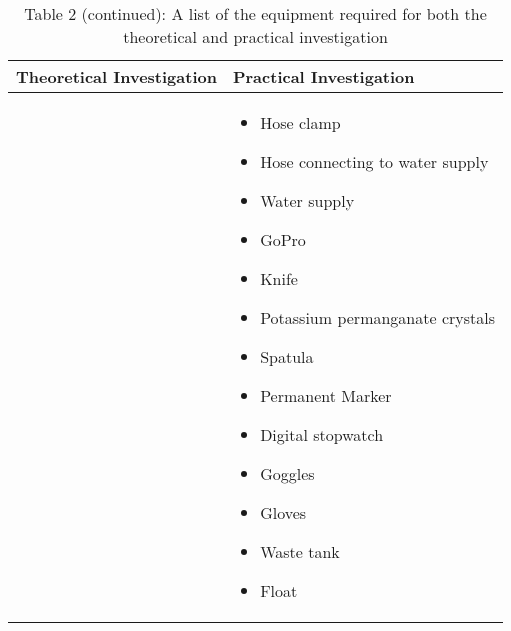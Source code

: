 \begin{table}[H]
	\centering
	\renewcommand{\arraystretch}{1.3}
	\begin{tabularx}{\textwidth}{|X|X|}
		\hline
		\textbf{Theoretical Investigation} & \textbf{Practical Investigation} \\
		\hline
		&
		\begin{itemize}[leftmargin=1.5em, itemsep=2pt, topsep=0pt, label=--]
			\item Hose clamp
			\item Hose connecting to water supply
			\item Water supply
			\item GoPro
			\item Knife
			\item Potassium permanganate crystals
			\item Spatula
			\item Permanent Marker
			\item Digital stopwatch
			\item Goggles
			\item Gloves
			\item Waste tank
			\item Float
		\end{itemize} \\
		\hline
	\end{tabularx}
	\caption*{Table 2 (continued): A list of the equipment required for both the theoretical and practical investigation}
	\label{tab:equipmentList2}
\end{table}
